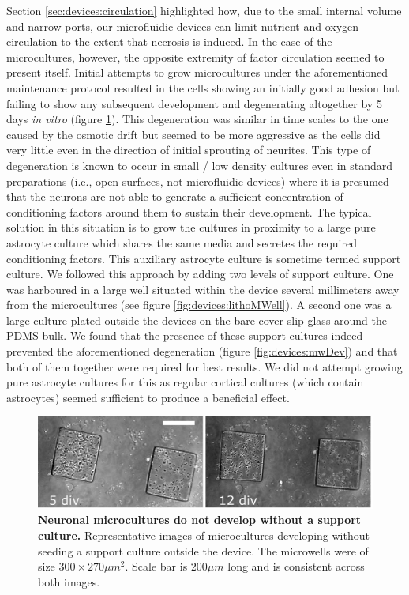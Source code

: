         Section \ref{sec:devices:circulation} highlighted how, due to the small internal volume and narrow ports, our microfluidic devices can limit nutrient and oxygen circulation to the extent that necrosis is induced. In the case of the microcultures, however, the opposite extremity of factor circulation seemed to present itself. Initial attempts to grow microcultures under the aforementioned maintenance protocol resulted in the cells showing an initially good adhesion but failing to show any subsequent development and degenerating altogether by 5 days \textit{in vitro} (figure \ref{fig:devices:noSupport}). This degeneration was similar in time scales to the one caused by the osmotic drift but seemed to be more aggressive as the cells did very little even in the direction of initial sprouting of neurites. This type of degeneration is known to occur in small / low density cultures even in standard preparations (i.e., open surfaces, not microfluidic devices) \cite{kaech2006culturing} where it is presumed that the neurons are not able to generate a sufficient concentration of conditioning factors around them to sustain their development. The typical solution in this situation is to grow the cultures in proximity to a large pure astrocyte culture which shares the same media and secretes the required conditioning factors. This auxiliary astrocyte culture is sometime termed support culture. We followed this approach by adding two levels of support culture. One was harboured in a large well situated within the device several millimeters away from the microcultures (see figure \ref{fig:devices:lithoMWell}). A second one was a large culture plated outside the devices on the bare cover slip glass around the PDMS bulk. We found that the presence of these support cultures indeed prevented the aforementioned degeneration (figure \ref{fig:devices:mwDev}) and that both of them together were required for best results. We did not attempt growing pure astrocyte cultures for this as regular cortical cultures (which contain astrocytes) seemed sufficient to produce a beneficial effect.

        \begin{figure}[h]
            \centering
            \includegraphics[width=13.8cm]{chapter4/figures/noSupport/noSupport.jpg}
            \caption[Neuronal microcultures growing without a support culture]{\textbf{Neuronal microcultures do not develop without a support culture.} Representative images of microcultures developing without seeding a support culture outside the device. The microwells were of size \(300\times270 \mu m^2\). Scale bar is \(200 \mu m\) long and is consistent across both images.}
            \label{fig:devices:noSupport}
        \end{figure}

